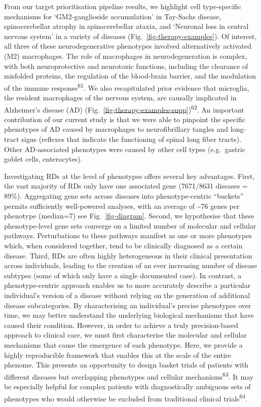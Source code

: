 \documentclass[
]{article}
\begin{document}
From our target prioritisation pipeline results, we highlight cell
type-specific mechanisms for `GM2-ganglioside accumulation' in Tay-Sachs
disease, spinocerebellar atrophy in spinocerebellar ataxia, and
`Neuronal loss in central nervous system' in a variety of diseases
(Fig.~\ref{fig-therapy-examples}). Of interest, all three of these
neurodegenerative phenotypes involved alternatively activated (M2)
macrophages. The role of macrophages in neurodegeneration is complex,
with both neuroprotective and neurotoxic functions, including the
clearance of misfolded proteins, the regulation of the blood-brain
barrier, and the modulation of the immune response\textsuperscript{61}.
We also recapitulated prior evidence that microglia, the resident
macrophages of the nervous system, are causally implicated in
Alzheimer's disease (AD)
(Fig.~\ref{fig-therapy-examples-supp})\textsuperscript{62}. An important
contribution of our current study is that we were able to pinpoint the
specific phenotypes of AD caused by macrophages to neurofibrillary
tangles and long-tract signs (reflexes that indicate the functioning of
spinal long fiber tracts). Other AD-associated phenotypes were caused by
other cell types (e.g.~gastric goblet cells, enterocytes).

Investigating RDs at the level of phenotypes offers several key
advantages. First, the vast majority of RDs only have one associated
gene (7671/8631 diseases = 89\%). Aggregating gene sets across diseases
into phenotype-centric ``buckets'' permits sufficiently well-powered
analyses, with an average of \textasciitilde76 genes per phenotype
(median=7) see Fig.~\ref{fig-diagram}. Second, we hypothesise that these
phenotype-level gene sets converge on a limited number of molecular and
cellular pathways. Perturbations to these pathways manifest as one or
more phenotypes which, when considered together, tend to be clinically
diagnosed as a certain disease. Third, RDs are often highly
heterogeneous in their clinical presentation across individuals, leading
to the creation of an ever increasing number of disease subtypes (some
of which only have a single documented case). In contrast, a
phenotype-centric approach enables us to more accurately describe a
particular individual's version of a disease without relying on the
generation of additional disease subcategories. By characterising an
individual's precise phenotypes over time, we may better understand the
underlying biological mechanisms that have caused their condition.
However, in order to achieve a truly precision-based approach to
clinical care, we must first characterise the molecular and cellular
mechanisms that cause the emergence of each phenotype. Here, we provide
a highly reproducible framework that enables this at the scale of the
entire phenome. This presents an opportunity to design basket trials of
patients with different diseases but overlapping phenotypes and cellular
mechanisms\textsuperscript{63}. It may be especially helpful for complex
patients with diagnostically ambiguous sets of phenotypes who would
otherwise be excluded from traditional clinical
trials\textsuperscript{64}.
\end{document}

